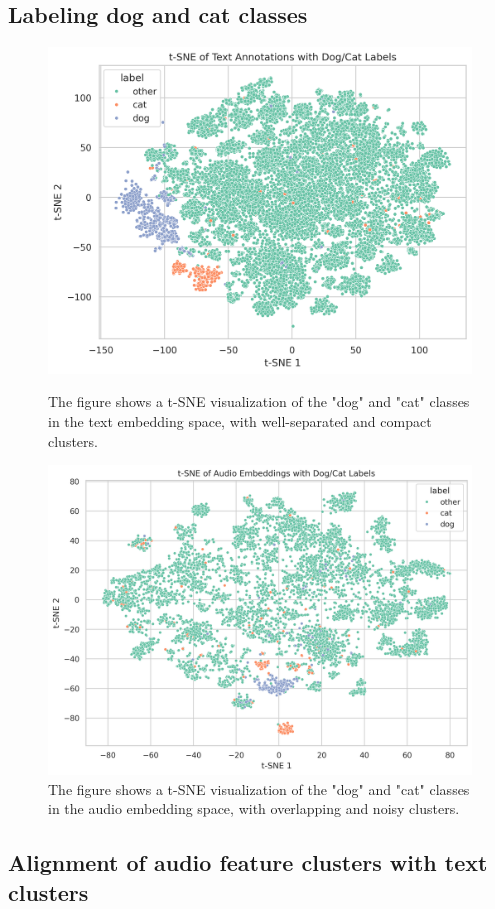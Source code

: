 \documentclass{article}
\begin{document}
\subsection{Labeling dog and cat classes}
\begin{figure}[H]
  \centering
  \begin{minipage}{0.45\textwidth} %
    \centering
    \includegraphics[width=0.5\linewidth]{figures/text_features/text_dogcat.png}
    \caption{The figure shows a t-SNE visualization of the "dog" and "cat" classes in the text embedding space, with well-separated and compact clusters.}
    \label{fig:silhouette_2}
  \end{minipage} \hspace{0.05\textwidth} %
  \begin{minipage}{0.45\textwidth} %
    \centering
    \includegraphics[width=0.5\linewidth]{figures/text_features/audio_dogcat.png}
    \caption{The figure shows a t-SNE visualization of the "dog" and "cat" classes in the audio embedding space, with overlapping and noisy clusters.}
    \label{fig:cluster_comp_2}
  \end{minipage}
\end{figure}

\subsection{Alignment of audio feature clusters with text clusters}
\end{document}
